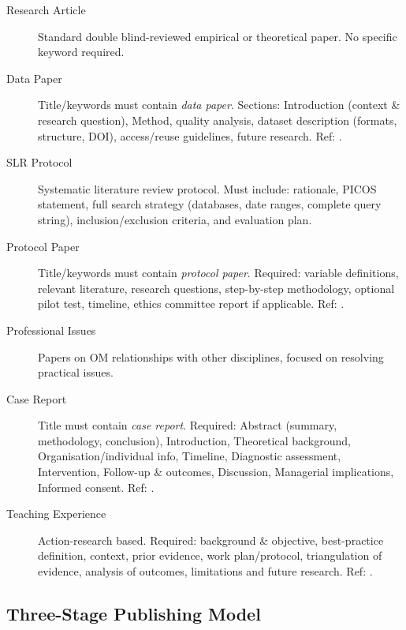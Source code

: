 \documentclass{wpom-upv}
\begin{document}
\begin{description}
  \item[Research Article] Standard double blind-reviewed empirical or
    theoretical paper. No specific keyword required.

  \item[Data Paper] Title/keywords must contain \textit{data paper}.
    Sections: Introduction (context \& research question), Method,
    quality analysis, dataset description (formats, structure, DOI),
    access/reuse guidelines, future research.
    Ref: \textcite{maringarcia2021three}.

  \item[SLR Protocol] Systematic literature review protocol. Must
    include: rationale, PICOS statement, full search strategy
    (databases, date ranges, complete query string),
    inclusion/exclusion criteria, and evaluation plan.

  \item[Protocol Paper] Title/keywords must contain
    \textit{protocol paper}. Required: variable definitions, relevant
    literature, research questions, step-by-step methodology, optional
    pilot test, timeline, ethics committee report if applicable.
    Ref: \textcite{maringarcia2021three}.

  \item[Professional Issues] Papers on OM relationships with other
    disciplines, focused on resolving practical issues.

  \item[Case Report] Title must contain \textit{case report}. Required:
    Abstract (summary, methodology, conclusion), Introduction,
    Theoretical background, Organisation/individual info, Timeline,
    Diagnostic assessment, Intervention, Follow-up \& outcomes,
    Discussion, Managerial implications, Informed consent.
    Ref: \textcite{maringarcia2022case}.

  \item[Teaching Experience] Action-research based. Required:
    background \& objective, best-practice definition, context,
    prior evidence, work plan/protocol, triangulation of evidence,
    analysis of outcomes, limitations and future research.
    Ref: \textcite{maringarcia2021teaching}.
\end{description}

\subsection{Three-Stage Publishing Model}
\end{document}

